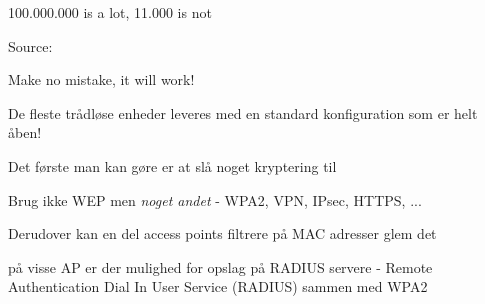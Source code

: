 \documentclass[20pt,landscape,a4paper,footrule]{foils}
\begin{document}

\centerline{100.000.000 is a lot, 11.000 is not}

Source:\\








\centerline{Make no mistake, it will work!}


\begin{list1}
\item De fleste trådløse enheder leveres med en standard
  konfiguration som er helt åben!
\item Det første man kan gøre er at slå noget kryptering til
\item Brug ikke WEP men \emph{noget andet} - WPA2, VPN,
  IPsec, HTTPS, ...
\item Derudover kan en del access points filtrere på MAC adresser glem
  det
\item på visse AP er der mulighed for opslag på RADIUS servere -
  Remote Authentication Dial In User Service (RADIUS) sammen med WPA2
\end{list1}









\end{document}
